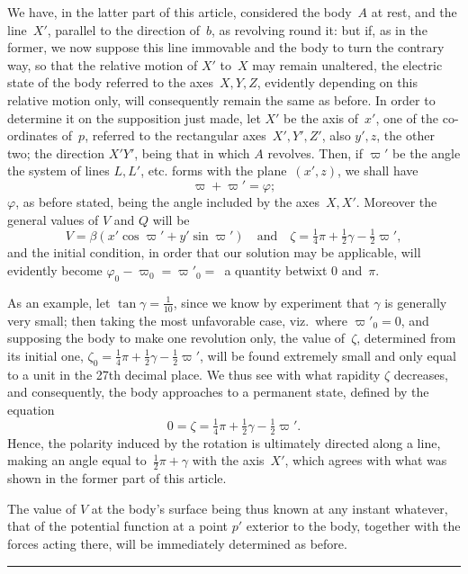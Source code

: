 \documentclass[11pt,notitlepage]{amsart}
\def\Crule{\begin{center}\rule[.5ex]{5em}{.2pt}\\[10pt]\end{center}}
\renewcommand{\phi}{\varphi}
\begin{document}
We have, in the latter part of this article, considered the body~$A$ at
rest, and the line~$X'$, parallel to the direction of~$b$,
as revolving round it:
but if, as in the former, we now suppose this line immovable and the body
to turn the contrary way, so that the relative motion of $X'$ to~$X$ may remain
unaltered, the electric state of the body referred to the axes~$X,Y,Z$, 
evidently depending on this relative motion only, will consequently remain the
same as before. In order to determine it on the supposition just made, let
$X'$ be the axis of~$x'$,
one of the co-ordinates of~$p$, referred to the rectangular
axes~$X',Y',Z'$, also $y',z$, the other two; the direction $X'Y'$, being
that in which $A$ revolves. Then, if $\varpi'$ be the angle the system of lines
$L,L'$, etc. forms with the plane~$(x',z)$, we shall have
\[
\varpi+\varpi'=\phi;
\]
$\phi$, as before stated, being the angle included by the axes~$X,X'$. Moreover
the general values of $V$ and $Q$ will be
\[
V=\beta(x'\cos\varpi'+y'\sin\varpi')
\quad\text{and}\quad
\zeta=\tfrac14\pi+\tfrac12\gamma-\tfrac12\varpi',
\]
and the initial condition, in order that our solution may be applicable, will
evidently become $\phi_0-\varpi_0=\varpi'_0=$\ a quantity betwixt $0$ and~$\pi$.

As an example, let $\tan\gamma=\frac{1}{10}$,
since we know by experiment that $\gamma$
is generally very small; then taking the most unfavorable case,
viz.\ where ${\varpi'_0=0}$,
and supposing the body to make one revolution only, the value of~$\zeta$,
determined from its initial one,
$\zeta_0=\frac14\pi+\frac12\gamma-\frac12\varpi'$,
will be found extremely
small and only equal to a unit in the 27th decimal place. We thus see with
what rapidity $\zeta$ decreases, and consequently, the body approaches to a 
permanent state, defined by the equation
\[
0=\zeta=\tfrac14\pi+\tfrac12\gamma-\tfrac12\varpi'.
\]
Hence, the polarity induced by the rotation is ultimately directed along a line,
making an angle equal to~$\frac12\pi+\gamma$
with the axis~$X'$, which agrees with what
was shown in the former part of this article.

The value of $V$ at the body's surface being thus known at any
instant whatever, that of the potential function at a point $p'$ exterior to the
body, together with the forces acting there, will be immediately determined
as before.
\Crule
\bigskip
\bigskip
\bigskip
\end{document}
